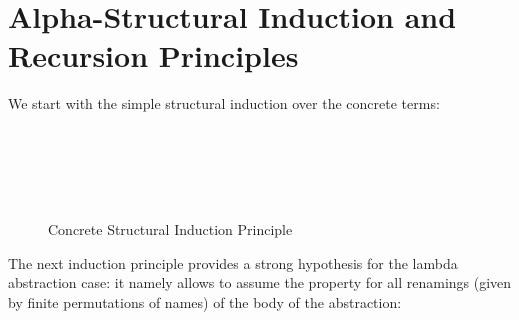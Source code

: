 \documentclass{entcs}
\begin{document}
\section{Alpha-Structural Induction and Recursion Principles}
\label{sec:induction}

We start with the simple structural induction over the concrete  terms:

\begin{figure}[!ht]
  
\begin{code}%
\> \AgdaSymbol{:} \AgdaSymbol{\{} \AgdaSymbol{:} \AgdaSymbol{\}(} \AgdaSymbol{:}    \AgdaSymbol{)} \<[41]%
\>[41]\<%
\\
\>[0]\<[2]%
\>[2]     \AgdaSymbol{(} \AgdaSymbol{))}\<%
\\
\>[0]\<[2]%
\>[2]            \AgdaSymbol{(}  \AgdaSymbol{))}\<%
\\
\>[0]\<[2]%
\>[2]         \AgdaSymbol{(}  \AgdaSymbol{))}\<%
\\
\>[0]\<[2]%
\>[2]     \<%
\end{code}

  \caption{Concrete Structural Induction Principle}
\label{fig:primInd}
\end{figure}

The next induction principle provides a strong hypothesis for the lambda abstraction case: it namely allows to assume the property for all renamings (given by finite permutations of names) of the body of the abstraction:
\end{document}
